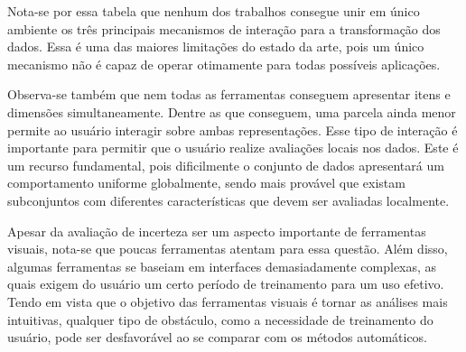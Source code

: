 Nota-se por essa tabela que nenhum dos trabalhos consegue
unir em único ambiente os três principais mecanismos de
interação para a transformação dos dados. Essa é uma das
maiores limitações do estado da arte, pois um único
mecanismo não é capaz de operar otimamente para todas
possíveis aplicações. 

Observa-se também que nem todas as ferramentas conseguem
apresentar itens e dimensões simultaneamente. Dentre as que
conseguem, uma parcela ainda menor permite ao usuário
interagir sobre ambas representações. Esse tipo de interação
é importante para permitir que o usuário realize avaliações
locais nos dados. Este é um recurso fundamental, pois
dificilmente o conjunto de dados apresentará um
comportamento uniforme globalmente, sendo mais provável que
existam subconjuntos com diferentes características que
devem ser avaliadas localmente.

Apesar da avaliação de incerteza ser um aspecto importante 
de ferramentas visuais, nota-se que poucas ferramentas
atentam para essa questão. Além disso, algumas ferramentas se
baseiam em interfaces demasiadamente complexas, as quais
exigem do usuário um certo período de treinamento para um
uso efetivo. Tendo em vista que o objetivo das ferramentas
visuais é tornar as análises mais intuitivas, qualquer tipo
de obstáculo, como a necessidade de treinamento do usuário,
pode ser desfavorável ao se comparar com os métodos
automáticos.

\newcommand{\redc}{\cellcolor{red!25}Não}
\newcommand{\greenc}{\cellcolor{green!25}Sim}

